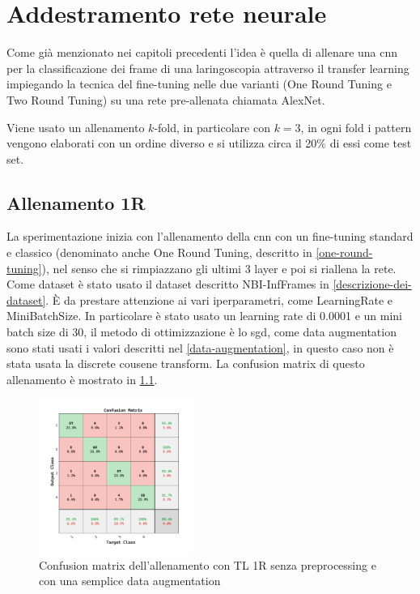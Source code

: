 \chapter{Addestramento rete neurale}\label{addestramento-rete-neurale}


Come già menzionato nei capitoli precedenti l’idea è quella di allenare una \gls{cnn} per la classificazione dei frame di una laringoscopia attraverso il transfer learning impiegando la tecnica del
fine-tuning nelle due varianti (One Round Tuning e Two Round Tuning)  su una rete pre-allenata chiamata AlexNet.


Viene usato un allenamento \(k\)-fold, in particolare con \(k=3\), in ogni fold i  pattern vengono elaborati con un
ordine diverso e si utilizza circa il 20\% di essi come test set.


\section{Allenamento 1R}\label{allenamento-1r}

La sperimentazione inizia con l'allenamento della \gls{cnn} con un fine-tuning standard e classico (denominato anche One Round Tuning, descritto in \cref{one-round-tuning}), nel senso che si rimpiazzano gli ultimi 3 layer e poi si riallena la rete. Come dataset è stato usato il dataset descritto NBI-InfFrames in \cref{descrizione-dei-dataset}. È da prestare attenzione ai vari iperparametri, come \Gls{LearningRate} e \Gls{MiniBatchSize}. In particolare è stato usato un learning rate di 0.0001 e un mini batch size di 30, il metodo di ottimizzazione è lo \gls{sgd}, come data augmentation sono stati usati i valori descritti nel \cref{data-augmentation}, in questo caso non è stata usata la discrete cousene transform. La confusion matrix di questo allenamento è mostrato in \cref{fig:one-liscio}.


\begin{figure}[ht]
    \centering
    \includegraphics[width=0.45\textwidth]{addestramento-rete-neurale/one-liscio.pdf}
    \caption{Confusion matrix dell'allenamento con TL 1R senza preprocessing e con una semplice data augmentation}
    \label{fig:one-liscio}
\end{figure}


